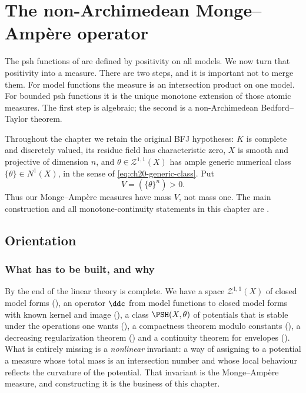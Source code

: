 \chapter{The non-Archimedean Monge--Amp\`ere operator}
\label{chap:bfj-ma}

The psh functions of  are defined by positivity on
all models. We now turn that positivity into a measure. There are two steps,
and it is important not to merge them. For model functions the measure is an
intersection product on one model. For bounded psh functions it is the unique
monotone extension of those atomic measures. The first step is algebraic; the
second is a non-Archimedean Bedford--Taylor theorem.

Throughout the chapter we retain the original BFJ hypotheses: \(K\) is
complete and discretely valued, its residue field has characteristic zero,
\(X\) is smooth and projective of dimension \(n\), and
\(\theta\in\mathcal Z^{1,1}(X)\) has ample generic numerical class
\(\{\theta\}\in N^1(X)\), in the sense of \eqref{eq:ch20-generic-class}. Put
\[
                         V=(\{\theta\}^n)>0.
\]
Thus our Monge--Amp\`ere measures have mass \(V\), not mass one. The main
construction and all monotone-continuity statements in this chapter are
\cite[\S\S2.7 and~3]{BFJ15}.

\section{Orientation}
\label{sec:ch24-orientation}

\subsection{What has to be built, and why}
\label{sec:ch24-why}

By the end of  the linear theory is complete.  We
have a space \(\mathcal Z^{1,1}(X)\) of closed model forms
(), an operator \(\ddc\) from model
functions to closed model forms with known kernel and image
(), a class \(\PSH(X,\theta)\) of potentials that is
stable under the operations one wants (), a
compactness theorem modulo constants (), a
decreasing regularization theorem ()
and a continuity theorem for envelopes ().
What is entirely missing is a \emph{nonlinear} invariant: a way of assigning
to a potential a measure whose total mass is an intersection number and whose
local behaviour reflects the curvature of the potential.  That invariant is
the Monge--Amp\`ere measure, and constructing it is the business of this
chapter.

